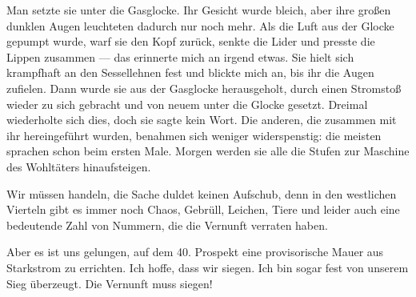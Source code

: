 Man setzte sie unter die Gasglocke. Ihr
Gesicht wurde bleich, aber ihre großen dunklen Augen leuchteten
dadurch nur noch mehr. Als die Luft aus der Glocke gepumpt wurde,
warf sie den Kopf zurück, senkte die Lider und presste die Lippen
zusammen — das erinnerte mich an irgend etwas. Sie hielt sich
krampfhaft an den Sessellehnen fest und blickte mich an, bis ihr
die Augen zufielen. Dann wurde sie aus der Gasglocke herausgeholt,
durch einen Stromstoß wieder zu sich gebracht und von neuem unter
die Glocke gesetzt. Dreimal wiederholte sich dies, doch sie sagte
kein Wort. Die anderen, die zusammen mit ihr hereingeführt wurden,
benahmen sich weniger widerspenstig: die meisten sprachen schon
beim ersten Male. Morgen werden sie alle die Stufen zur Maschine
des Wohltäters hinaufsteigen.

Wir müssen handeln, die Sache duldet keinen Aufschub, denn in den
westlichen Vierteln gibt es immer noch Chaos, Gebrüll, Leichen,
Tiere und leider auch eine bedeutende Zahl von Nummern, die die
Vernunft verraten haben.

Aber es ist uns gelungen, auf dem 40.
Prospekt eine provisorische Mauer aus Starkstrom zu errichten. Ich
hoffe, dass wir siegen. Ich bin sogar fest von unserem Sieg
überzeugt. Die Vernunft muss siegen!



